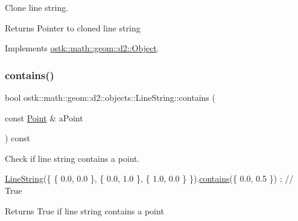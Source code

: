 Clone line string. 

\begin{DoxyReturn}{Returns}
Pointer to cloned line string 
\end{DoxyReturn}


Implements \hyperlink{classostk_1_1math_1_1geom_1_1d2_1_1_object_a98dedc6792aef35308966ca768eb3e14}{ostk\+::math\+::geom\+::d2\+::\+Object}.

\mbox{\label{classostk_1_1math_1_1geom_1_1d2_1_1objects_1_1_line_string_a04cc661c265dc5777b08754c8015c600}} 
\subsubsection{\texorpdfstring{contains()}{contains()}}
{\footnotesize\ttfamily bool ostk\+::math\+::geom\+::d2\+::objects\+::\+Line\+String\+::contains (\begin{DoxyParamCaption}\item[{const \hyperlink{classostk_1_1math_1_1geom_1_1d2_1_1objects_1_1_point}{Point} \&}]{a\+Point }\end{DoxyParamCaption}) const}



Check if line string contains a point. 


\begin{DoxyCode}
\hyperlink{classostk_1_1math_1_1geom_1_1d2_1_1objects_1_1_line_string_ae99b409ec3eddf804a7c83f2452b1249}{LineString}(\{ \{ 0.0, 0.0 \}, \{ 0.0, 1.0 \}, \{ 1.0, 0.0 \} \}).\hyperlink{classostk_1_1math_1_1geom_1_1d2_1_1objects_1_1_line_string_a04cc661c265dc5777b08754c8015c600}{contains}(\{ 0.0, 0.5 \}) ; \textcolor{comment}{// True}
\end{DoxyCode}


\begin{DoxyReturn}{Returns}
True if line string contains a point 
\end{DoxyReturn}
\mbox{\label{classostk_1_1math_1_1geom_1_1d2_1_1objects_1_1_line_string_a3557befd15577368d8cc2f9c2a74dfec}} 
